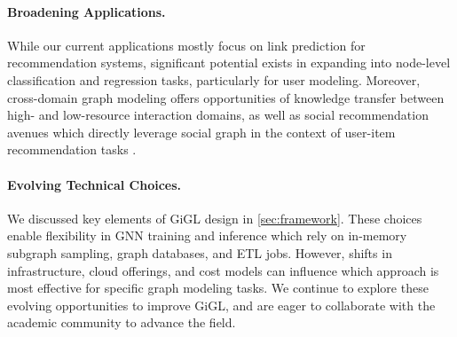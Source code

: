 \paragraph{Broadening Applications.} 
While our current applications mostly focus on link prediction for recommendation systems, significant potential exists in expanding into node-level classification and regression tasks, particularly for user modeling.
Moreover, cross-domain graph modeling offers opportunities of knowledge transfer between high- and low-resource interaction domains, as well as social recommendation avenues which directly leverage social graph in the context of user-item recommendation tasks \cite{fan2019graph, zhu2021cross}.

\paragraph{Evolving Technical Choices.} We discussed key elements of GiGL design in \cref{sec:framework}. These choices enable flexibility in GNN training and inference which rely on in-memory subgraph sampling, graph databases, and ETL jobs. 
However, shifts in infrastructure, cloud offerings, and cost models can influence which approach is most effective for specific graph modeling tasks. 
We continue to explore these evolving opportunities to improve GiGL, and are eager to 
collaborate with the academic community to advance the field.

